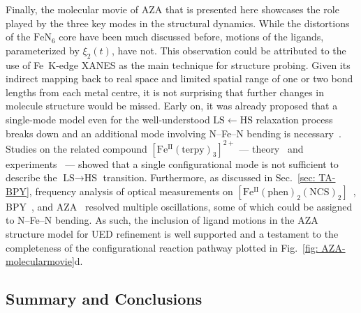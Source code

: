 Finally, the molecular movie of AZA that is presented here showcases
the role played by the three key modes in the structural dynamics.
While the distortions of the $\mathrm{FeN_6}$ core have been much discussed before,
motions of the ligands, parameterized by $\xi_2(t)$, have not.
%
This observation could be attributed to the use of Fe~K-edge XANES as the main technique
for structure probing. Given its indirect mapping back to real space
and limited spatial range of one or two bond lengths from each metal centre,
it is not surprising that further changes in molecule structure would be missed.
%
Early on, it was already proposed that a single-mode model even for
the well-understood $\mathrm{LS} \leftarrow \mathrm{HS}$ relaxation process
breaks down and an additional mode involving N--Fe--N bending is necessary~\cite{Hauser2006}.
%
Studies on the related compound $\mathrm{[Fe^{II}(terpy)_3]^{2+}}$ ---
theory~\cite{Papai2013} and experiments~\cite{Canton2014, Vanko2015, XZhang2015} ---
showed that a single configurational mode is not sufficient to describe
the $\text{LS} \rightarrow \text{HS}$ transition.
%
Furthermore, as discussed in Sec.~\ref{sec: TA-BPY},
frequency analysis of optical measurements
on $\mathrm{[Fe^{II}(phen)_2 (NCS)_2]}$~\cite{Cammarata2014, Bertoni2015},
BPY~\cite{Consani2009, Aubock2015, Field2016, Lemke2017},
and AZA~\cite{Marino2013, Marino2016} resolved multiple oscillations,
some of which could be assigned to N--Fe--N bending.
%
As such, the inclusion of ligand motions in the AZA structure model
for UED refinement is well supported and
a testament to the completeness of the configurational reaction pathway
plotted in Fig.~\ref{fig: AZA-molecularmovie}d.


\subsection{Summary and Conclusions}

